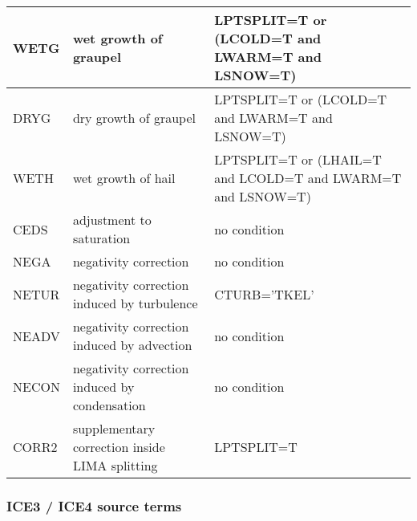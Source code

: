 \begin{longtable} {|p{}|p{}|p{}|}
WETG   & wet growth of graupel                          & LPTSPLIT=T or (LCOLD=T and LWARM=T and LSNOW=T) \\\hline
DRYG   & dry growth of graupel                          & LPTSPLIT=T or (LCOLD=T and LWARM=T and LSNOW=T) \\\hline
WETH   & wet growth of hail                             & LPTSPLIT=T or (LHAIL=T and LCOLD=T and LWARM=T and LSNOW=T) \\\hline
CEDS   & adjustment to saturation                       & no condition \\\hline
NEGA   & negativity correction                          & no condition \\\hline
NETUR  & negativity correction induced by turbulence    & CTURB='TKEL' \\\hline
NEADV  & negativity correction induced by advection     & no condition \\\hline
NECON  & negativity correction induced by condensation  & no condition \\\hline
CORR2  & supplementary correction inside LIMA splitting & LPTSPLIT=T \\\hline
\end{longtable}

\subsubsection{ICE3 / ICE4 source terms}

